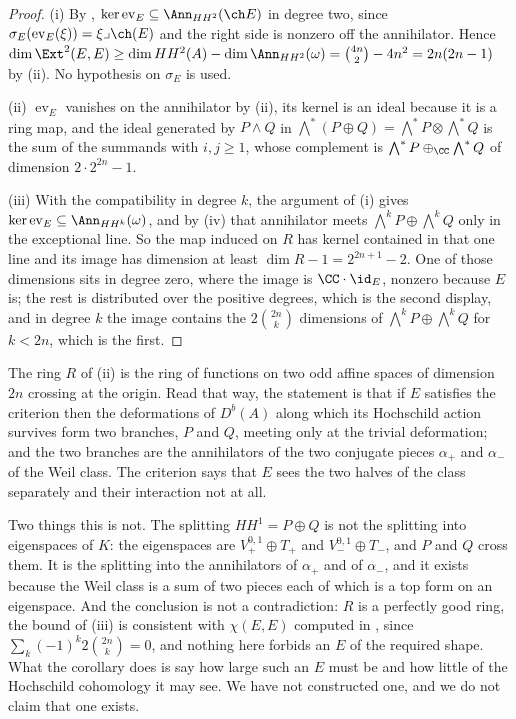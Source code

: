 \begin{proof}
(i) By , $\ker\operatorname{ev}_{E}\subseteq\Ann_{HH^{2}}(\ch E)$
in degree two, since $\sigma_{E}(\operatorname{ev}_{E}(\xi))=\xi\lrcorner\ch(E)$
and the right side is nonzero off the annihilator. Hence
$\dim\Ext^{2}(E,E)\ge\dim HH^{2}(A)-\dim\Ann_{HH^{2}}(\omega)
=\binom{4n}{2}-4n^{2}=2n(2n-1)$ by (ii). No hypothesis
on $\sigma_{E}$ is used.

(ii) $\operatorname{ev}_{E}$ vanishes on the annihilator by
(ii), its kernel is an ideal because it is a ring map, and
the ideal generated by $P\wedge Q$ in $\bigwedge^{*}(P\oplus Q)
=\bigwedge^{*}P\otimes\bigwedge^{*}Q$ is the sum of the summands with
$i,j\ge1$, whose complement is $\bigwedge^{*}P\oplus_{\CC}\bigwedge^{*}Q$ of
dimension $2\cdot2^{2n}-1$.

(iii) With the compatibility in degree $k$, the argument of (i) gives
$\ker\operatorname{ev}_{E}\subseteq\Ann_{HH^{k}}(\omega)$, and by
(iv) that annihilator meets $\bigwedge^{k}P\oplus
\bigwedge^{k}Q$ only in the exceptional line. So the map induced on $R$ has
kernel contained in that one line and its image has dimension at least
$\dim R-1=2^{2n+1}-2$. One of those dimensions sits in degree zero, where the
image is $\CC\cdot\id_{E}$, nonzero because $E$ is; the rest is distributed
over the positive degrees, which is the second display, and in degree $k$ the
image contains the $2\binom{2n}{k}$ dimensions of
$\bigwedge^{k}P\oplus\bigwedge^{k}Q$ for $k<2n$, which is the first.
\end{proof}

\begin{remark}\label{rem:twobranches}
The ring $R$ of (ii) is the ring of functions on two odd
affine spaces of dimension $2n$ crossing at the origin. Read that way, the
statement is that if $E$ satisfies the criterion then the deformations of
$D^{b}(A)$ along which its Hochschild action survives form two branches, $P$
and $Q$, meeting only at the trivial deformation; and the two branches are the
annihilators of the two conjugate pieces $\alpha_{+}$ and $\alpha_{-}$ of the
Weil class. The criterion says that $E$ sees the two halves of the class
separately and their interaction not at all.

Two things this is not. The splitting $HH^{1}=P\oplus Q$ is not the splitting
into eigenspaces of $K$: the eigenspaces are
$V_{+}^{0,1}\oplus T_{+}$ and $V_{-}^{0,1}\oplus T_{-}$, and $P$ and $Q$ cross
them. It is the splitting into the annihilators of $\alpha_{+}$ and of
$\alpha_{-}$, and it exists because the Weil class is a sum of two pieces each
of which is a top form on an eigenspace. And the conclusion is not a
contradiction: $R$ is a perfectly good ring, the bound of (iii) is consistent
with $\chi(E,E)$ computed in , since
$\sum_{k}(-1)^{k}2\binom{2n}{k}=0$, and nothing here forbids an $E$ of the
required shape. What the corollary does is say how large such an $E$ must be
and how little of the Hochschild cohomology it may see. We have not
constructed one, and we do not claim that one exists.
\end{remark}

